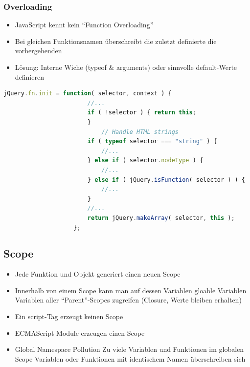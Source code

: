 \documentclass[a4paper, landscape, 8pt]{scrartcl}
\begin{document}
\begin{multicols*}{4}
        \subsubsection{Overloading}
        \begin{itemize}
            \item JavaScript kennt kein \enquote{Function Overloading}
            \item Bei gleichen Funktionsnamen überschreibt die zuletzt definierte die vorhergehenden
            \item Lösung: Interne Wiche (typeof \& arguments) oder sinnvolle default-Werte definieren
        \end{itemize}

        \begin{lstlisting}[language=JavaScript]
                    jQuery.fn.init = function( selector, context ) {
                        //...
                        if ( !selector ) { return this;
                        }
                            // Handle HTML strings
                        if ( typeof selector === "string" ) {
                            //...
                        } else if ( selector.nodeType ) {
                            //...
                        } else if ( jQuery.isFunction( selector ) ) {
                            //...
                        }
                        //...
                        return jQuery.makeArray( selector, this );
                    };
        \end{lstlisting}

        \subsection{Scope}
        \begin{itemize}
            \item Jede Funktion und Objekt generiert einen neuen Scope
            \item Innerhalb von einem Scope kann man auf
            \subitem dessen Variablen
            \subitem gloable Variablen
            \subitem Variablen aller \enquote{Parent}-Scopes zugreifen (Closure, Werte bleiben erhalten)
            \item Ein script-Tag erzeugt keinen Scope
            \item ECMAScript Module erzeugen einen Scope
            \item Global Namespace Pollution
            \subitem Zu viele Variablen und Funktionen im globalen Scope
            \subitem Variablen oder Funktionen mit identischem Namen überschreiben sich
        \end{itemize}


\end{multicols*}
\end{document}
